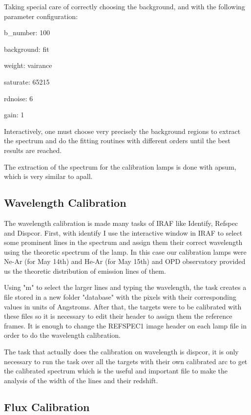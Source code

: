 Taking special care of correctly choosing the background, and with the following parameter configuration:

b\_number: 100

background: fit

weight: vairance

saturate: 65215

rdnoise: 6

gain: 1

Interactively, one must choose very precisely the background regions to extract the spectrum and do the fitting routines with different orders until the best results are reached.

The extraction of the spectrum for the calibration lamps is done with apsum, which is very similar to apall.

\subsection{Wavelength Calibration}

The wavelength calibration is made many tasks of IRAF like Identify, Refspec and Dispcor. First, with identify I use the interactive window in IRAF to select some prominent lines in the spectrum and assign them their correct wavelength using the theoretic spectrum of the lamp. In this case our calibration lamps were Ne-Ar (for May 14th) and He-Ar (for May 15th)  and OPD observatory provided us the theoretic distribution of emission lines of them.

Using "m" to select the larger lines and typing the wavelength, the task creates a file stored in a new folder "database" with the pixels with their corresponding values in units of Angstroms. After that, the targets were to be calibrated with these files so it is necessary to edit their header to assign them the reference frames. It is enough to change the REFSPEC1 image header on each lamp file in order to do the wavelength calibration. 

The task that actually does the calibration on wavelength is dispcor, it is only necessary to run the task over all the targets with their own calibrated arc to get the calibrated spectrum which is the useful and important file to make the analysis of the width of the lines and their redshift.

\subsection{Flux Calibration}

